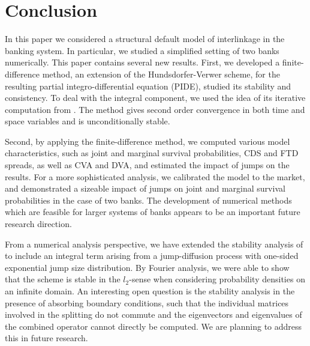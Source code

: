 \section{Conclusion}
In this paper we considered a structural default model of interlinkage in the banking system. In particular, we studied a simplified setting of two banks numerically. This paper contains several new results. First, we developed a finite-difference method,
an extension of the Hundsdorfer-Verwer scheme, for the resulting partial integro-differential equation (PIDE), studied its stability and consistency. To deal with the integral component, we used the idea of its iterative computation from \cite{LiptonSepp}. The method gives second order convergence in both time and space variables and is unconditionally stable.

Second, by applying the finite-difference method, we computed various model characteristics, such as joint and marginal survival probabilities, CDS and FTD spreads, as well as CVA and DVA, and estimated the impact of jumps on the results. For a more sophisticated analysis, we calibrated the model to the market, and demonstrated a sizeable impact of jumps on joint and marginal survival probabilities in the case of two banks.
The development of numerical methods which are feasible for larger systems of banks appears to be an important future research direction.

From a numerical analysis perspective, we have extended the stability analysis of \cite{intHoutStability} to include an integral term arising from a jump-diffusion process with one-sided exponential jump size distribution.
By Fourier analysis, we were able to show that the scheme is stable in the $l_2$-sense when considering probability densities on an infinite domain. An interesting open question is the stability analysis in the presence of absorbing boundary conditions, such that the individual matrices involved in the splitting do not commute and the eigenvectors and eigenvalues of the combined operator cannot directly be computed.
We are planning to address this in future research.